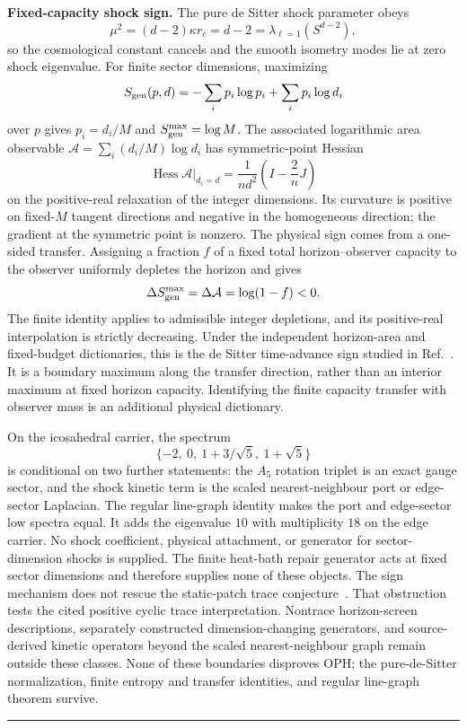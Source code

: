 \textbf{Fixed-capacity shock sign.}
The pure de Sitter shock parameter obeys
\[
\mu^2=(d-2)\kappa r_c=d-2=\lambda_{\ell=1}(S^{d-2}),
\]
so the cosmological constant cancels and the smooth isometry modes lie at
zero shock eigenvalue. For finite sector dimensions, maximizing
\[
S_{\rm gen}(p,d)=-\sum_i p_i\log p_i+\sum_i p_i\log d_i
\]
over \(p\) gives \(p_i=d_i/M\) and \(S_{\rm gen}^{\max}=\log M\).
The associated logarithmic area observable
\(\mathcal A=\sum_i(d_i/M)\log d_i\) has symmetric-point Hessian
\[
\left.\operatorname{Hess}\mathcal A\right|_{d_i=d}
=\frac1{nd^2}\left(I-\frac2nJ\right)
\]
on the positive-real relaxation of the integer dimensions. Its curvature is
positive on fixed-\(M\) tangent directions and negative in the homogeneous
direction; the gradient at the symmetric point is nonzero. The physical sign
comes from a one-sided transfer. Assigning a fraction \(f\) of a fixed total
horizon--observer capacity to the observer uniformly depletes the horizon and
gives
\[
\Delta S_{\rm gen}^{\max}=\Delta\mathcal A=\log(1-f)<0.
\]
The finite identity applies to admissible integer depletions, and its
positive-real interpolation is strictly decreasing.
Under the independent horizon-area and fixed-budget dictionaries, this is the
de Sitter time-advance sign studied in
Ref.~\cite{chenStanfordTangYang2026}. It is a boundary maximum along the
transfer direction, rather than an interior maximum at fixed horizon
capacity. Identifying the finite capacity transfer with observer mass
is an additional physical dictionary.

On the icosahedral carrier, the spectrum
\[
\{-2,\ 0,\ 1+3/\sqrt5,\ 1+\sqrt5\}
\]
is conditional on two further statements: the \(A_5\) rotation triplet is an
exact gauge sector, and the shock kinetic term is the scaled
nearest-neighbour port or edge-sector Laplacian. The regular line-graph
identity makes the port and edge-sector low spectra equal. It adds the
eigenvalue \(10\) with multiplicity \(18\) on the edge carrier. No shock
coefficient, physical attachment, or generator for sector-dimension shocks
is supplied. The finite heat-bath repair generator acts at fixed sector
dimensions and therefore supplies none of these objects. The sign mechanism
does not rescue the static-patch trace conjecture~\cite{ophdesittershock}.
That obstruction tests the cited positive cyclic trace interpretation.
Nontrace horizon-screen descriptions, separately constructed
dimension-changing generators, and source-derived kinetic operators beyond
the scaled nearest-neighbour graph remain outside these classes. None of
these boundaries disproves OPH; the pure-de-Sitter normalization, finite
entropy and transfer identities, and regular line-graph theorem survive.

\begin{center}\rule{0.5\linewidth}{0.5pt}\end{center}



